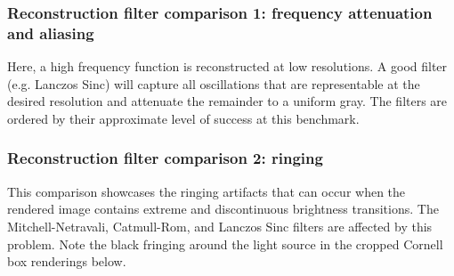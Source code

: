 \newpage
\subsubsection{Reconstruction filter comparison 1: frequency attenuation and aliasing}
\vspace{-2mm}
Here, a high frequency function is reconstructed at low resolutions. A good filter
(e.g. Lanczos Sinc) will capture all oscillations that are representable at the desired
resolution and attenuate the remainder to a uniform gray. The filters are ordered by their
approximate level of success at this benchmark.
\vspace{-4mm}
\vspace{-4mm}
\newpage
\subsubsection{Reconstruction filter comparison 2: ringing}
This comparison showcases the ringing artifacts that can occur when the rendered
image contains extreme and discontinuous brightness transitions. The
Mitchell-Netravali, Catmull-Rom, and Lanczos Sinc filters are affected by this problem.
Note the black fringing around the light source in the cropped Cornell box renderings below.
\vspace{-4mm}
\vspace{-4mm}
